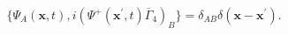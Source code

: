 \begin{equation}
\{\Psi_A (\mathbf{x},t),i\left(\Psi^+ (\mathbf{x}^{\prime }
,t)\overline{\Gamma}_4 \right)_B
\}=\delta_{AB}\delta\left(\mathbf{x}- \mathbf{x}^{\prime }\right)
. \label{82}
\end{equation}

